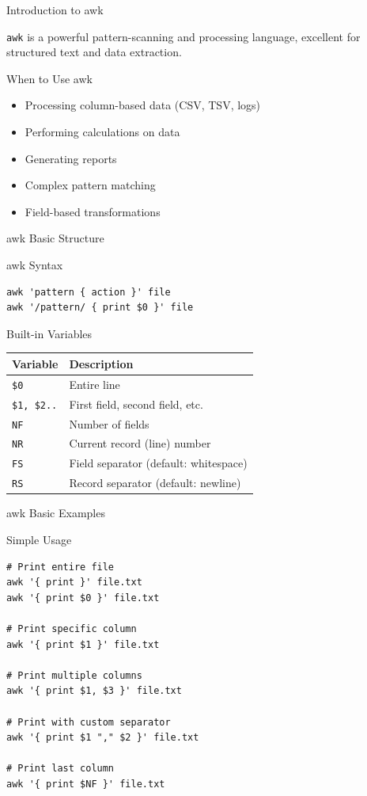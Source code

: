 \documentclass[presentation,aspectratio=1610]{beamer}
\begin{document}
\begin{frame}[label={sec:orgd4cb5b1},fragile]{Introduction to awk}
 \begin{definition}\label{sec:orgab6a19d}
\texttt{awk} is a powerful pattern-scanning and processing language, excellent for structured text and data extraction.
\end{definition}
\begin{block}{When to Use awk}
\begin{itemize}
\item Processing column-based data (CSV, TSV, logs)
\item Performing calculations on data
\item Generating reports
\item Complex pattern matching
\item Field-based transformations
\end{itemize}
\end{block}
\end{frame}
\begin{frame}[label={sec:org5208bcb},fragile]{awk Basic Structure}
 \begin{block}{awk Syntax}
\begin{verbatim}
awk 'pattern { action }' file
awk '/pattern/ { print $0 }' file
\end{verbatim}
\end{block}
\begin{exampleblock}{Built-in Variables}\label{sec:org283d6e8}
\begin{center}
\begin{tabular}{ll}
Variable & Description\\
\hline
\texttt{\$0} & Entire line\\
\texttt{\$1, \$2..} & First field, second field, etc.\\
\texttt{NF} & Number of fields\\
\texttt{NR} & Current record (line) number\\
\texttt{FS} & Field separator (default: whitespace)\\
\texttt{RS} & Record separator (default: newline)\\
\end{tabular}
\end{center}
\end{exampleblock}
\end{frame}
\begin{frame}[label={sec:orgaf1df5b},fragile]{awk Basic Examples}
 \begin{block}{Simple Usage}
\begin{verbatim}
# Print entire file
awk '{ print }' file.txt
awk '{ print $0 }' file.txt

# Print specific column
awk '{ print $1 }' file.txt

# Print multiple columns
awk '{ print $1, $3 }' file.txt

# Print with custom separator
awk '{ print $1 "," $2 }' file.txt

# Print last column
awk '{ print $NF }' file.txt
\end{verbatim}
\end{block}
\end{frame}
\end{document}
